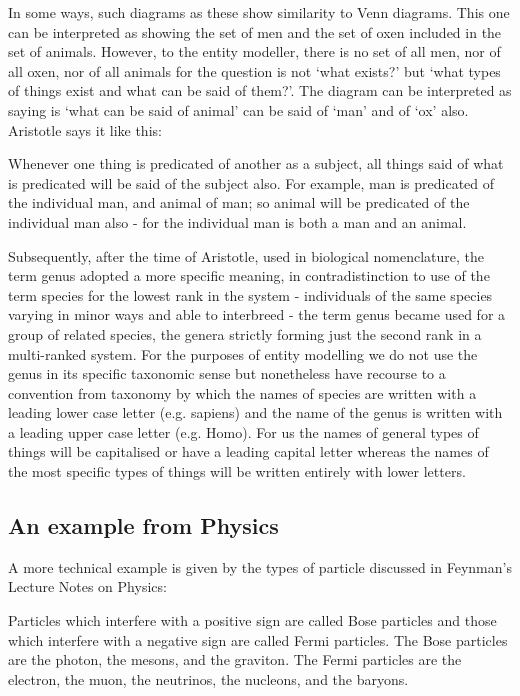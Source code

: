 \noindent In some ways, such diagrams as these show similarity to Venn diagrams. This one can be interpreted as showing the set of men and the set of oxen included in the set of animals. However, to the entity modeller, there is no set of all men, nor of all oxen, nor of all animals for the question is not `what exists?' but `what types of things exist and what can be said of them?'. The diagram can be interpreted as saying is `what can be said of animal' can be said of `man' and of `ox' also. \\

\noindent Aristotle says it like this:

\begin{erquote}
Whenever one thing is predicated of another as a subject, all things said of what is predicated will be said of the subject also. For example, man is predicated of the individual man, and animal of man; so animal will be predicated of the individual man also - for the individual man is both a man and an animal.
\end{erquote}

\noindent Subsequently, after the time of Aristotle, used in biological nomenclature, the term genus adopted a more specific meaning, in contradistinction to use of the term species for the lowest rank in the system - individuals of the same species varying in minor ways and able to interbreed - the term genus became used for a group of related species, the genera strictly forming just the second rank in a multi-ranked system. For the purposes of entity modelling we do not use the genus in its specific taxonomic sense but nonetheless have recourse to a convention from taxonomy by which the names of species are written with a leading lower case letter (e.g. sapiens) and the name of the genus is written with a leading upper case letter (e.g. Homo). For us the names of general types of things will be capitalised or have a leading capital letter whereas the names of the most specific types of things will be written entirely with lower letters. \\

\subsection{An example from Physics}
\noindent A more technical example is given by the types of particle discussed in Feynman's Lecture Notes on Physics:\\
\begin{erquote}
Particles which interfere with a positive sign are called Bose particles and those which interfere with a negative sign are called Fermi particles. The Bose particles are the photon, the mesons, and the graviton. The Fermi particles are the electron, the muon, the neutrinos, the nucleons, and the baryons.\\
\end{erquote}

